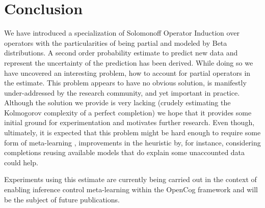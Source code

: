 \documentclass[runningheads]{llncs}
\begin{document}
\section{Conclusion}
\label{con}
We have introduced a specialization of Solomonoff Operator Induction
over operators with the particularities of being partial and modeled
by Beta distributions. A second order probability estimate to predict
new data and represent the uncertainty of the prediction has been
derived. While doing so we have uncovered an interesting problem, how
to account for partial operators in the estimate. This problem appears
to have no obvious solution, is manifestly under-addressed by the
research community, and yet important in practice. Although the
solution we provide is very lacking (crudely estimating the Kolmogorov
complexity of a perfect completion) we hope that it provides some
initial ground for experimentation and motivates further research.
Even though, ultimately, it is expected that this problem might be
hard enough to require some form of meta-learning
\cite{Goertzel16Probabilistic}, improvements in the heuristic by, for
instance, considering completions reusing available models that do
explain some unaccounted data could help.

Experiments using this estimate are currently being carried out in the
context of enabling inference control meta-learning within the OpenCog
framework and will be the subject of future publications.

%
%


\end{document}
